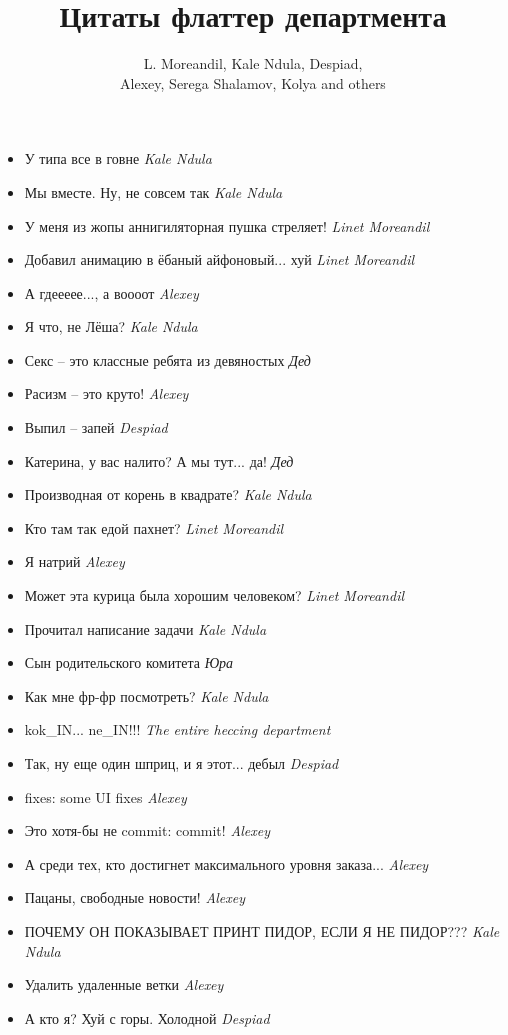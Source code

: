 \documentclass[11pt]{book}
\title{Цитаты флаттер департмента}
\author{L. Moreandil, Kale Ndula, Despiad,\\ Alexey, Serega Shalamov, Kolya and others}
\date{}
\newcommand{\entry}[2] {\large{\textmd{#1}} \textemdash \small{\emph{#2}}}
\newcommand{\kn}{Kale Ndula}
\newcommand{\lm}{Linet Moreandil}
\newcommand{\dd}{Despiad}
\newcommand{\al}{Alexey}
\begin{document}
\maketitle


\begin{itemize}[leftmargin=0cm]

\item \entry{У типа все в говне}{\kn}
\item \entry{Мы вместе. Ну, не совсем так}{\kn}
\item \entry{У меня из жопы аннигиляторная пушка стреляет!}{\lm}
\item \entry{Добавил анимацию в ёбаный айфоновый... хуй}{\lm}
\item \entry{А гдеееее..., а воооот}{\al}
\item \entry{Я что, не Лёша?}{\kn}
\item \entry{Секс -- это классные ребята из девяностых}{Дед}
\item \entry{Расизм -- это круто!}{\al}
\item \entry{Выпил -- запей}{\dd}
\item \entry{Катерина, у вас налито? А мы тут... да!}{Дед}
\item \entry{Производная от корень в квадрате?}{\kn}
\item \entry{Кто там так едой пахнет?}{\lm}
\item \entry{Я натрий}{\al}
\item \entry{Может эта курица была хорошим человеком?}{\lm}
\item \entry{Прочитал написание задачи}{\kn}
\item \entry{Сын родительского комитета}{Юра}
\item \entry{Как мне фр-фр посмотреть?}{\kn}
\item \entry{kok\_IN... ne\_IN!!!}{The entire heccing department}
\item \entry{Так, ну еще один шприц, и я этот... дебыл}{\dd}
\item \entry{fixes: some UI fixes}{\al}
\item \entry{Это хотя-бы не commit: commit!}{\al}
\item \entry{А среди тех, кто достигнет максимального уровня заказа...}{\al}
\item \entry{Пацаны, свободные новости!}{\al}
\item \entry{ПОЧЕМУ ОН ПОКАЗЫВАЕТ ПРИНТ ПИДОР, ЕСЛИ Я НЕ ПИДОР???}{\kn}
\item \entry{Удалить удаленные ветки}{\al}
\item \entry{А кто я? Хуй с горы. Холодной}{\dd}

\end{itemize}
\end{document}
